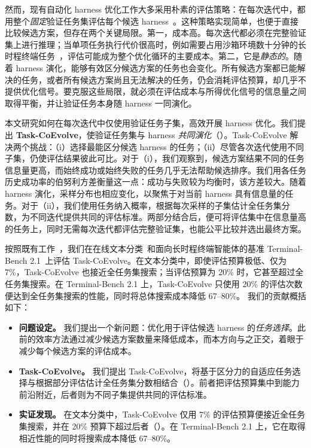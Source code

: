 \documentclass{article}
\begin{document}
然而，现有自动化 harness 优化工作大多采用朴素的评估策略：在每次迭代中，都用整个\emph{固定}验证任务集评估每个候选 harness~\citep{lee2026meta, lin2026agentic, zhang2026harnessing, wang2026rethinking}。这种策略实现简单，也便于直接比较候选方案，但存在两个关键局限。第一，成本高。每次迭代都必须在完整验证集上进行推理；当单项任务执行代价很高时，例如需要占用沙箱环境数十分钟的长时程终端任务~\citep{merrill2026terminal}，评估可能成为整个优化循环的主要成本。第二，它是\emph{静态的}。随着 harness 演化，能够有效区分候选方案的任务也会变化。所有候选方案都已能解决的任务，或者所有候选方案尚且无法解决的任务，仍会消耗评估预算，却几乎不提供优化信号。要克服这些局限，就必须在评估成本与所得优化信号的信息量之间取得平衡，并让验证任务本身随 harness 一同演化。

本文研究如何在每次迭代中仅使用验证任务子集，高效开展 harness 优化。我们提出 \textbf{Task-CoEvolve}，使验证任务集与 harness \emph{共同演化}（）。Task-CoEvolve 解决两个挑战：（i）选择最能区分候选 harness 的任务；（ii）尽管各次迭代使用不同子集，仍使评估结果彼此可比。对于（i），我们观察到，候选方案结果不同的任务信息量更高，而始终成功或始终失败的任务几乎无法帮助候选排序。我们用各任务历史成功率的伯努利方差衡量这一点：成功与失败较为均衡时，该方差较大。随着 harness 演化，采样分布也相应变化，以聚焦于对当前 harness 具有信息量的任务。对于（ii），我们使用任务纳入概率，根据每次采样的子集估计全任务集分数，为不同迭代提供共同的评估标准。两部分结合后，便可将评估集中在信息量高的任务上，同时无需每次迭代都评估完整验证集，也能公平比较并选出最终方案。

按照既有工作~\citep{lee2026meta}，我们在在线文本分类~\citep{fei2024lawbench, gretel2023symptom, schneider2016s}和面向长时程终端智能体的基准 Terminal-Bench 2.1~\citep{merrill2026terminal}上评估 Task-CoEvolve。在文本分类中，即使评估预算极低、仅为 7\%，Task-CoEvolve 也接近全任务集搜索；当评估预算为 20\% 时，它甚至超过全任务集搜索。在 Terminal-Bench 2.1 上，Task-CoEvolve 只使用 20\% 的评估次数便达到全任务集搜索的性能，同时将总体搜索成本降低 67--80\%。
我们的贡献概括如下：
\begin{itemize}
\item \textbf{问题设定。} 我们提出一个新问题：优化用于评估候选 harness 的\emph{任务选择}。此前的效率方法通过减少候选方案数量来降低成本，而本方向与之正交，着眼于减少每个候选方案的评估成本。

\item \textbf{Task-CoEvolve。} 我们提出 Task-CoEvolve，将基于区分力的自适应任务选择与根据部分评估估计全任务集分数相结合（）。前者把评估预算集中到能力前沿附近，后者则为不同子集提供共同的评估标准。

\item \textbf{实证发现。} 在文本分类中，Task-CoEvolve 仅用 7\% 的评估预算便接近全任务集搜索，并在 20\% 预算下超过后者（）。在 Terminal-Bench 2.1 上，它在取得相近性能的同时将搜索成本降低 67--80\%。
\end{itemize}
\end{document}
